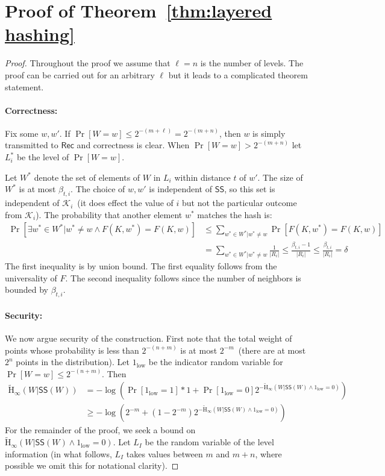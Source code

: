 \documentclass[11pt]{article}
\newcommand{\thref}[1]{\mbox{Theorem~\ref{#1}}}
\newcommand{\class}[1]{{\ensuremath{\mathsf{#1}}}}
\newcommand{\sketch}{\ensuremath{\class{SS}}\xspace}
\newcommand{\rec}{\ensuremath{\class{Rec}}\xspace}
\newcommand{\Hav}{\tilde{\mathrm{H}}_\infty}
\begin{document}
\section{Proof of \thref{thm:layered hashing}}
\label{sec:proof of layered hashing}
\begin{proof}
Throughout the proof we assume that $\ell = n$ is the number of levels.  The proof can be carried out for an arbitrary $\ell$ but it leads to a complicated theorem statement.

\paragraph{Correctness:}  Fix some $w, w'$.  If $\Pr[W=w]\le 2^{-(m+\ell)} = 2^{-(m+n)}$, then $w$ is simply transmitted to $\rec$ and correctness is clear.  When $\Pr[W=w]> 2^{-(m+n)}$ let $L_i^*$ be the level of $\Pr[W=w]$.

Let $W^*$ denote the set of elements of $W$ in $L_i$ within distance $t$ of $w'$.  The size of $W^*$ is at most $\beta_{t,i}$. The choice of $w, w'$ is independent of $\sketch$, so this set is independent of $\mathcal{K}_i$~(it does effect the value of $i$ but not the particular outcome from $\mathcal{K}_i$).  The probability that another element $w^*$ matches the hash is:
\begin{align*}
\Pr[\exists w^* \in W^* |w^* \neq w \wedge F(K, w^*) = F(K, w)] &\le \sum_{w^*\in W^* | w^*\neq w} \Pr[F(K, w^*) = F(K, w)] \\
 &= \sum_{w^*\in W^* | w^*\neq w} \frac{1}{|R_i|} \le \frac{\beta_{t,i}-1}{|R_i|}\le \frac{\beta_{t, i}}{|R_i|} = \delta
\end{align*}
The first inequality is by union bound. The first equality follows from the universality of $F$.  The second inequality follows since the number of neighbors is bounded by $\beta_{t,i}$.  

\paragraph{Security:}
We now argue security of the construction.  First note that the total weight of points whose probability is less than $2^{-(n+m)}$ is at most $2^{-m}$~(there are at most $2^n$ points in the distribution).  Let $1_{\text{low}}$ be the indicator random variable for $\Pr[W=w]\le 2^{-(n+m)}$.  Then 
\begin{align}
\Hav(W | \sketch(W)) &= -\log \left(\Pr[1_{\text{low}}=1] * 1 + \Pr[1_{\text{low}} =0]   2^{-\Hav(W | \sketch(W) \wedge 1_{\text{low}} = 0)}\right)\nonumber\\
&\ge -\log\left( 2^{-m} + (1-2^{-m})2^{-\Hav(W | \sketch(W) \wedge 1_{\text{low}} = 0)}\label{eq:min-entropy}\right)
\end{align}
For the remainder of the proof, we seek a bound on $\Hav(W | \sketch(W) \wedge 1_{\text{low}} =0).$  Let $L_I$ be the random variable of the level information (in what follows, $L_I$ takes values between $m$ and $m+n$, where possible we omit this for notational clarity). 


\end{proof}
\end{document}
